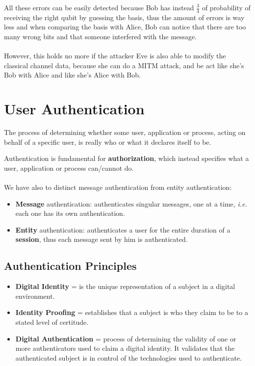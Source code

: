 \documentclass[oneside]{academica}
\begin{document}
All these errors can be easily detected because Bob has instead $\frac{3}{4}$ of probability of receiving the right qubit by guessing the basis, thus the amount of errors is way less and when comparing the basis with Alice, Bob can notice that there are too many wrong bits and that someone interfered with the message.
\\\\
However, this holds no more if the attacker Eve is also able to modify the classical channel data, because she can do a MITM attack, and be act like she's Bob with Alice and like she's Alice with Bob.

\chapter{User Authentication}

\begin{definition}
  The process of determining whether some user, application or process, acting on behalf of a specific user, is really who or what it declares itself to be.
\end{definition}

Authentication is fundamental for \textbf{authorization}, which instead specifies what a user, application or process can/cannot do.
\\\\
We have also to distinct message authentication from entity authentication:
\begin{itemize}
  \item \textbf{Message} authentication: authenticates singular messages, one at a time, \textit{i.e.} each one has its own authentication.
  \item \textbf{Entity} authentication: authenticates a user for the entire duration of a \textbf{session}, thus each message sent by him is authenticated.
\end{itemize}

\section{Authentication Principles}

\begin{itemize}
  \item \textbf{Digital Identity} = is the unique representation of a subject in a digital environment.
  \item \textbf{Identity Proofing} = establishes that a subject is who they claim to be to a stated level of certitude.
  \item \textbf{Digital Authentication} = process of determining the validity of one or more authenticators used to claim a digital identity. It validates that the authenticated subject is in control of the technologies used to authenticate.
\end{itemize}
\end{document}

